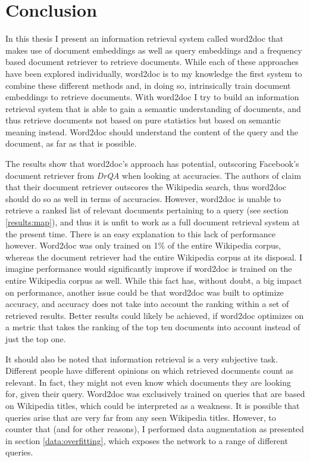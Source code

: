 \chapter{Conclusion}
\label{conclusion}

In this thesis I present an information retrieval system called word2doc that makes use of document embeddings as well as query
embeddings and a frequency based document retriever to retrieve documents. While each of these approaches have been explored
individually, word2doc is to my knowledge the first system to combine these different methods and, in doing so, intrinsically
train document embeddings to retrieve documents. With word2doc I try to build an information retrieval system that is able to
gain a semantic understanding of documents, and thus retrieve documents not based on pure statistics but based on semantic
meaning instead. Word2doc should understand the content of the query and the document, as far as that is possible.

The results show that word2doc's approach has potential, outscoring Facebook's document retriever from \textit{DrQA} \citep{drqa}
when looking at accuracies. The authors of \citet{drqa} claim that their document retriever outscores the Wikipedia search,
thus word2doc should do
so as well in terms of accuracies. However, word2doc is unable to retrieve a ranked list of relevant documents pertaining to a
query (see section \ref{results:map}), and thus it is unfit to work as a full document retrieval system at the present time. There
is an easy explanation to this lack of performance however. Word2doc was only trained on 1\% of the entire Wikipedia corpus, whereas
the document retriever had the entire Wikipedia corpus at its disposal. I imagine performance would significantly improve if
word2doc is trained on the entire Wikipedia corpus as well. While this fact has, without doubt, a big impact on performance, another
issue could be that word2doc was built to optimize accuracy, and accuracy does not take into account the ranking within a set
of retrieved results. Better results could likely be achieved, if word2doc optimizes on a metric that takes the ranking of the top ten
documents into account instead of just the top one.

It should also be noted that information retrieval is a very subjective task. Different people have different opinions on which
retrieved documents count as relevant. In fact, they might not even know which documents they are looking for, given their query.
Word2doc was exclusively trained on queries that are based on Wikipedia titles, which could be interpreted as a weakness. It is
possible that queries arise that are very far from any seen Wikipedia titles. However, to counter that (and for other reasons),
I performed data augmentation as presented in section \ref{data:overfitting}, which exposes the network to a range of different
queries.

